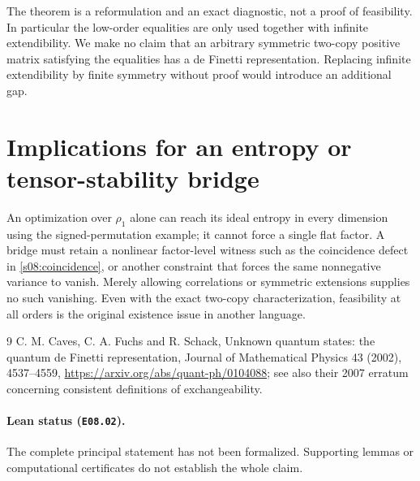 The theorem is a reformulation and an exact diagnostic, not a proof
of feasibility. In particular the low-order equalities are only used
together with infinite extendibility. We make no claim that an
arbitrary symmetric two-copy positive matrix satisfying the equalities
has a de Finetti representation. Replacing infinite extendibility by
finite symmetry without proof would introduce an additional gap.

\section{Implications for an entropy or tensor-stability bridge}
An optimization over $\rho_1$ alone can reach its ideal entropy in
every dimension using the signed-permutation example; it cannot
force a single flat factor. A bridge must retain a nonlinear
factor-level witness such as the coincidence defect in
\eqref{s08:coincidence}, or another constraint that forces the same
nonnegative variance to vanish. Merely allowing correlations or
symmetric extensions supplies no such vanishing. Even with the exact
two-copy characterization, feasibility at all orders is the original
existence issue in another language.

\begin{thebibliography}{9}
 C. M. Caves, C. A. Fuchs and R. Schack,
Unknown quantum states: the quantum de Finetti representation,
Journal of Mathematical Physics 43 (2002), 4537--4559,
\url{https://arxiv.org/abs/quant-ph/0104088}; see also their 2007
erratum concerning consistent definitions of exchangeability.
\end{thebibliography}


\paragraph{Lean status (\texttt{E08.02}).} The complete principal statement has not been formalized. Supporting lemmas or computational certificates do not establish the whole claim.
